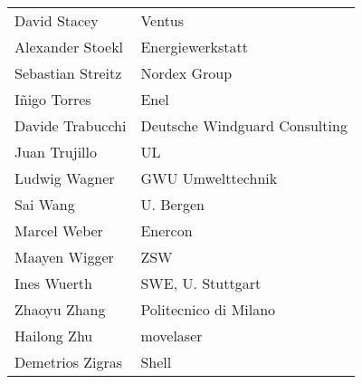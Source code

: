\begin{supertabular}{@{}|p{\tabcolsep}|p{\tabcolsep}|@{}}
David Stacey & Ventus \\
Alexander Stoekl & Energiewerkstatt \\
Sebastian Streitz & Nordex Group \\
I\~nigo Torres & Enel\\
Davide Trabucchi & Deutsche Windguard Consulting \\
Juan Trujillo & UL \\
Ludwig Wagner & GWU Umwelttechnik \\
Sai Wang & U. Bergen \\
Marcel Weber & Enercon \\
Maayen Wigger & ZSW \\
Ines Wuerth & SWE, U. Stuttgart \\
Zhaoyu Zhang & Politecnico di Milano \\
Hailong Zhu & movelaser\\
Demetrios Zigras & Shell \\
\hline
\end{supertabular}
\egroup